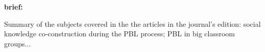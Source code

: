 \documentclass[class=article, crop=false]{standalone}
\begin{document}
\begin{adjustwidth}{-60pt}{-30pt}
\begin{singlespace}


\begin{minipage}{\textwidth}

\begin{pabox}[label={myusecounter}]{\hfill  \cite{Hung2021}}

\textbf{brief:}
\vspace{5pt}

Summary of the subjects covered in the the articles in the journal's edition: social knowledge co-construction during the PBL process; PBL in big classroom groups...
\vspace{5pt}

\tcblower




\end{pabox}
\end{minipage}

\end{singlespace}
\end{adjustwidth}
\end{document}
